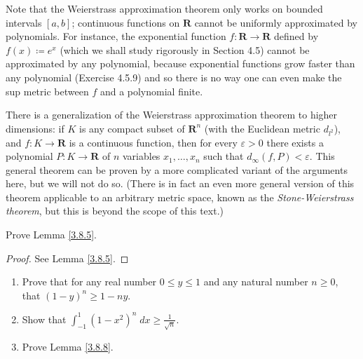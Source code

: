 \begin{remark}\label{3.8.20}
    Note that the Weierstrass approximation theorem only works on bounded intervals \([a, b]\);
    continuous functions on \(\mathbf{R}\) cannot be uniformly approximated by polynomials.
    For instance, the exponential function \(f : \mathbf{R} \to \mathbf{R}\) defined by \(f(x) \coloneqq e^x\) (which we shall study rigorously in Section 4.5) cannot be approximated by any polynomial, because exponential functions grow faster than any polynomial (Exercise 4.5.9) and so there is no way one can even make the sup metric between \(f\) and a polynomial finite.
\end{remark}

\begin{remark}\label{3.8.21}
    There is a generalization of the Weierstrass approximation theorem to higher dimensions:
    if \(K\) is any compact subset of \(\mathbf{R}^n\) (with the Euclidean metric \(d_{l^2}\)), and \(f : K \to \mathbf{R}\) is a continuous function, then for every \(\varepsilon > 0\) there exists a polynomial \(P : K \to \mathbf{R}\) of \(n\) variables \(x_1, \dots, x_n\) such that \(d_\infty(f, P) < \varepsilon\).
    This general theorem can be proven by a more complicated variant of the arguments here, but we will not do so.
    (There is in fact an even more general version of this theorem applicable to an arbitrary metric space, known as the \emph{Stone-Weierstrass theorem}, but this is beyond the scope of this text.)
\end{remark}

\exercisesection

\begin{exercise}\label{ex 3.8.1}
    Prove Lemma \ref{3.8.5}.
\end{exercise}

\begin{proof}
    See Lemma \ref{3.8.5}.
\end{proof}

\begin{exercise}\label{ex 3.8.2}
    \quad
    \begin{enumerate}
        \item Prove that for any real number \(0 \leq y \leq 1\) and any natural number \(n \geq 0\), that \((1 - y)^n \geq 1 - ny\).
        \item Show that \(\int_{-1}^1 (1 - x^2)^n \; dx \geq \frac{1}{\sqrt{n}}\).
        \item Prove Lemma \ref{3.8.8}.
    \end{enumerate}
\end{exercise}

